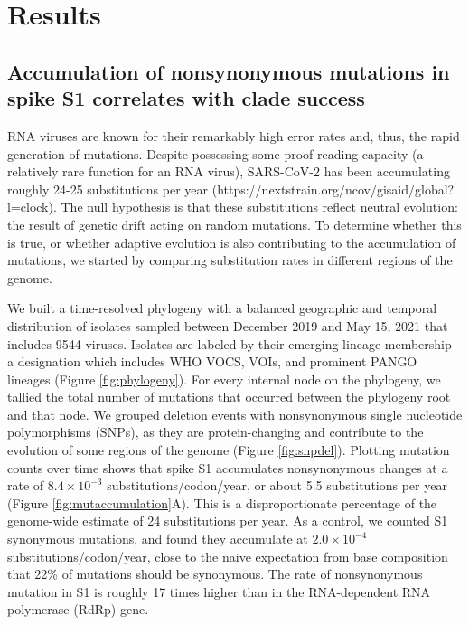 \documentclass[11pt,oneside,letterpaper]{article}
\begin{document}
\section*{Results}
\subsection*{Accumulation of nonsynonymous mutations in spike S1 correlates with clade success}
RNA viruses are known for their remarkably high error rates and, thus, the rapid generation of mutations. 
Despite possessing some proof-reading capacity (a relatively rare function for an RNA virus), SARS-CoV-2 has been accumulating roughly 24-25 substitutions per year (https://nextstrain.org/ncov/gisaid/global?l=clock). 
The null hypothesis is that these substitutions reflect neutral evolution: the result of genetic drift acting on random mutations. 
To determine whether this is true, or whether adaptive evolution is also contributing to the accumulation of mutations, we started by comparing substitution rates in different regions of the genome.

We built a time-resolved phylogeny with a balanced geographic and temporal distribution of isolates sampled between December 2019 and May 15, 2021 that includes 9544 viruses. 
Isolates are labeled by their emerging lineage membership- a designation which includes WHO VOCS, VOIs, and prominent PANGO lineages (Figure \ref{fig:phylogeny}). 
For every internal node on the phylogeny, we tallied the total number of mutations that occurred between the phylogeny root and that node. 
We grouped deletion events with nonsynonymous single nucleotide polymorphisms (SNPs), as they are protein-changing and contribute to the evolution of some regions of the genome (Figure \ref{fig:snpdel}). 
Plotting mutation counts over time shows that spike S1 accumulates nonsynonymous changes at a rate of $8.4 \times 10^{-3}$ substitutions/codon/year, or about 5.5 substitutions per year (Figure \ref{fig:mutaccumulation}A). 
This is a disproportionate percentage of the genome-wide estimate of 24 substitutions per year. As a control, we counted S1 synonymous mutations, and found they accumulate at $2.0 \times 10^{-4}$ substitutions/codon/year, close to the naive expectation from base composition that 22\% of mutations should be synonymous. 
The rate of nonsynonymous mutation in S1 is roughly 17 times higher than in the RNA-dependent RNA polymerase (RdRp) gene.
\end{document}
